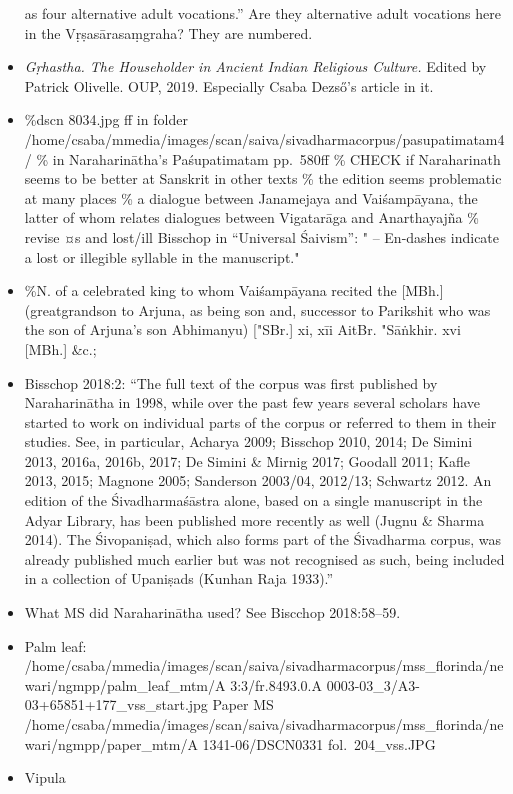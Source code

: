 \documentclass[]{article}
\begin{document}
\begin{itemize}
  as four alternative adult vocations.'' Are they alternative adult
  vocations here in the Vṛṣasārasaṃgraha? They are numbered.
\item
  \textit{Gṛhastha. The Householder in Ancient Indian 
      Religious Culture.} Edited by Patrick Olivelle. OUP, 2019.
  Especially Csaba Dezső's article in it.
\item
  \%dscn 8034.jpg ff in folder
  /home/csaba/mmedia/images/scan/saiva/sivadharmacorpus/pasupatimatam4/
  \% in Naraharinātha's Paśupatimatam pp.~580ff \% CHECK if Naraharinath
  seems to be better at Sanskrit in other texts \% the edition seems
  problematic at many places \% a dialogue between Janamejaya and
  Vaiśampāyana, the latter of whom relates dialogues between Vigatarāga
  and Anarthayajña \% revise ¤s and lost/ill Bisschop in ``Universal
  Śaivism'': " -- En-dashes indicate a lost or illegible syllable in the
  manuscript."
\item
  \%N. of a celebrated king to whom Vaiśampāyana recited the {[}MBh.{]}
  (greatgrandson to Arjuna, as being son and, successor to Parikshit who
  was the son of Arjuna's son Abhimanyu) {[}"SBr.{]} xi, xīi AitBr.
  "Sāṅkhir. xvi {[}MBh.{]} \&c.;
\item
  Bisschop 2018:2: ``The full text of the corpus was first published by
  Naraharinātha in 1998, while over the past few years several scholars
  have started to work on individual parts of the corpus or referred to
  them in their studies. See, in particular, Acharya 2009; Bisschop
  2010, 2014; De Simini 2013, 2016a, 2016b, 2017; De Simini \& Mirnig
  2017; Goodall 2011; Kafle 2013, 2015; Magnone 2005; Sanderson 2003/04,
  2012/13; Schwartz 2012. An edition of the Śivadharmaśāstra alone,
  based on a single manuscript in the Adyar Library, has been published
  more recently as well (Jugnu \& Sharma 2014). The Śivopaniṣad, which
  also forms part of the Śivadharma corpus, was already published much
  earlier but was not recognised as such, being included in a collection
  of Upaniṣads (Kunhan Raja 1933).''
\item
  What MS did Naraharinātha used? See Biscchop 2018:58--59.
\item
  Palm leaf:
  /home/csaba/mmedia/images/scan/saiva/sivadharmacorpus/mss\_florinda/newari/ngmpp/palm\_leaf\_mtm/A
  3:3/fr.8493.0.A 0003-03\_3/A3-03+65851+177\_vss\_start.jpg Paper MS
  /home/csaba/mmedia/images/scan/saiva/sivadharmacorpus/mss\_florinda/newari/ngmpp/paper\_mtm/A
  1341-06/DSCN0331 fol.~204\_vss.JPG
\item
  Vipula


\end{itemize}
\end{document}
